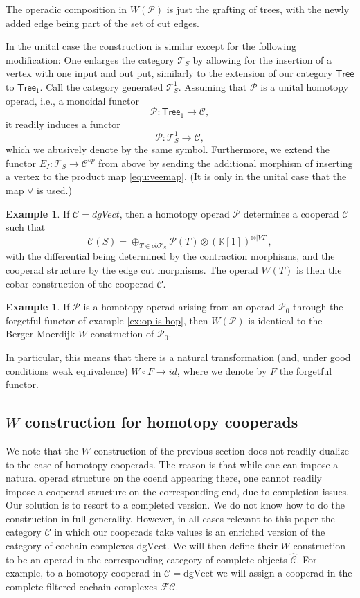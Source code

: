 \documentclass[a4paper]{amsart}
\theoremstyle{plain}
\theoremstyle{definition}
\newtheorem{ex}[thm]{Example}
\newcommand{\K}{{\mathbb{K}}}
\newcommand{\op}{\mathcal}
\newcommand{\mC}{{\mathcal{C}}}
\newcommand{\mT}{{\mathcal{T}}}
\newcommand{\Tree}{{\mathsf{Tree}}}
\newcommand{\dgVect}{\mathrm{dgVect}}
\newcommand{\FC}{\mathcal{FC}}
\begin{document}
The operadic composition in $W(\op P)$ is just the grafting of trees, with the newly added edge being part of the set of cut edges.

In the unital case the construction is similar except for the following modification:
One enlarges the category $\mT_S$ by allowing for the insertion of a vertex with one input and out put, similarly to the extension of our category $\Tree$ to $\Tree_1$. Call the category generated $\mT_S^1$.
Assuming that $\op P$ is a unital homotopy operad, i.e., a monoidal functor 
\[
\op P\colon \Tree_1 \to \mC,
\]
it readily induces a functor 
\[
\op P :  \mT_S^1\to \mC,
\]
which we abusively denote by the same symbol.
Furthermore, we extend the functor $E_I : \mT_S \to \mC^{op}$ from above by sending the additional morphism of inserting a vertex to the product map \eqref{equ:veemap}. (It is only in the unital case that the map $\vee$ is used.)



\begin{ex}
If $\mC=dgVect$, then a homotopy operad $\op P$ determines a cooperad $\op C$ such that 
\[
\op C(S) = \oplus_{T\in ob\mT_S} \op P(T)\otimes (\K[1])^{\otimes |VT|},
\]
with the differential being determined by the contraction morphisms, and the cooperad structure by the edge cut morphisms. The operad $W(T)$ is then the cobar construction of the cooperad $\op C$.
\end{ex}

\begin{ex}
If $\op P$ is a homotopy operad arising from an operad $\op P_0$ through  the forgetful functor of example \ref{ex:op is hop}, then $W(\op P)$ is identical to the Berger-Moerdijk $W$-construction of $\op P_0$.
\end{ex}
In particular, this means that there is a natural transformation (and, under good conditions weak equivalence) $W\circ F \to \mathit{id}$, where we denote by $F$ the forgetful functor. 


\subsection{\texorpdfstring{$W$}{W} construction for homotopy cooperads}
We note that the $W$ construction of the previous section does not readily dualize to the case of homotopy cooperads.
The reason is that while one can impose a natural operad structure on the coend appearing there, one cannot readily impose a cooperad structure on the corresponding end, due to completion issues.
Our solution is to resort to a completed version. We do not know how to do the construction in full generality.
However, in all cases relevant to this paper the category $\mC$ in which our cooperads take values is an enriched version of the category of cochain complexes $\dgVect$.
We will then define their $W$ construction to be an operad in the corresponding category of complete objects $\hat \mC$. For example, to a homotopy cooperad in $\mC=\dgVect$ we will assign a cooperad in the complete filtered cochain complexes $\FC$.
\end{document}
